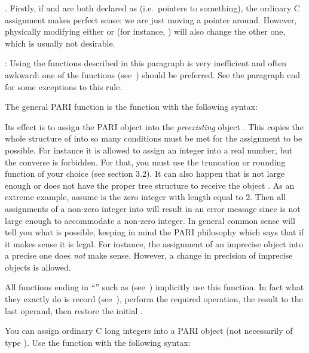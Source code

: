 .
Firstly, if  and  are both declared as  (i.e.~pointers
to something), the ordinary C assignment  makes perfect sense: we
are just moving a pointer around. However, physically modifying either
 or  (for instance, ) will also change the other
one, which is usually not desirable. \label{se:assign}

: Using the functions described in this
paragraph is very inefficient and often awkward: one of the 
functions (see~) should be preferred. See the paragraph
end for some exceptions to this rule.

\noindent
The general PARI  function is the function  with
the following syntax:


\noindent
Its effect is to assign the PARI object  into the {\it preexisting\/}
object . This copies the whole structure of  into  so
many conditions must be met for the assignment to be possible. For instance
it is allowed to assign an integer into a real number, but the converse is
forbidden.  For that, you must use the truncation or rounding function of
your choice (see section 3.2). It can also happen that  is not large
enough or does not have the proper tree structure to receive the object
. As an extreme example, assume  is the zero integer with length
equal to 2. Then all assignments of a non-zero integer into  will
result in an error message since  is not large enough to accommodate
a non-zero integer.  In general common sense will tell you what is possible,
keeping in mind the PARI philosophy which says that if it makes sense it is
legal. For instance, the assignment of an imprecise object into a precise one
does {\it not\/} make sense. However, a change in precision of imprecise
objects is allowed.

All functions ending in ``'' such as 
(see~) implicitly use this function. In fact what they
exactly do is record {} (see~), perform the
required operation,  the result to the last operand, then
restore the initial .

You can assign ordinary C long integers into a PARI object (not necessarily
of type ). Use the function  with the following
syntax:

